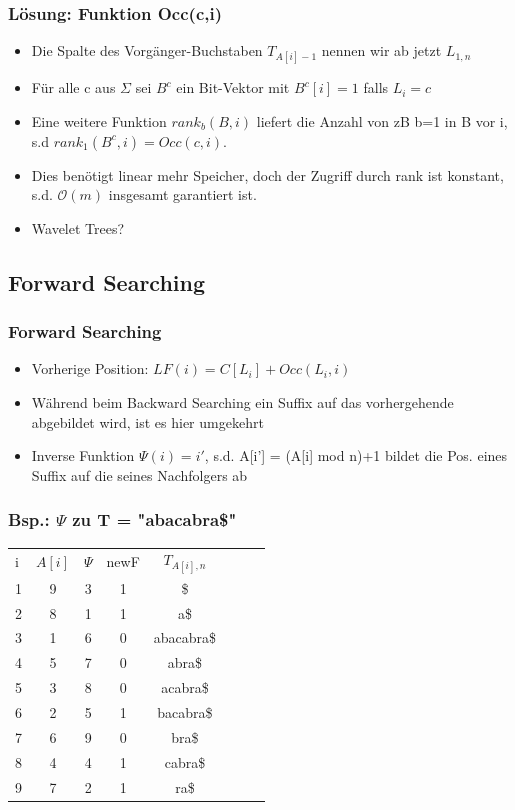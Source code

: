 \documentclass{beamer}
\begin{document}
\begin{frame}
\frametitle{L\"osung: Funktion Occ(c,i)}
\begin{itemize}
\item Die Spalte des Vorg\"anger-Buchstaben $T_{A[i]-1}$ nennen wir ab jetzt $L_{1,n}$
\item F\"ur alle c aus $\Sigma$ sei $B^{c}$ ein Bit-Vektor mit $B^{c}[i] = 1$ falls $L_{i} = c$
\item Eine weitere Funktion $rank_{b}(B,i)$ liefert die Anzahl von zB b=1 in B vor i, s.d $rank_{1}(B^{c},i) = Occ(c,i)$.
\item Dies ben\"otigt linear mehr Speicher, doch der Zugriff durch rank ist konstant, s.d. ${ \scriptstyle \mathcal{O	}}(m)$ insgesamt garantiert ist.
\item Wavelet Trees?
\end{itemize}
\end{frame}
\begin{frame}
\subsection{Forward Searching}
\frametitle{Forward Searching}
\begin{itemize}
\item Vorherige Position: $LF(i) = C[L_i] + Occ(L_i,i)$
\item W\"ahrend beim Backward Searching ein Suffix auf das vorhergehende abgebildet wird, ist es hier umgekehrt
\item Inverse Funktion $\Psi(i) = i'$, s.d. A[i'] = (A[i] mod n)+1 bildet die Pos. eines Suffix auf die seines Nachfolgers ab
\end{itemize}
\end{frame}
\begin{frame}
\frametitle{Bsp.: $\Psi$ zu T = "abacabra\$"}
\begin{tabular}{l c cc ccc r}
i & $A[i]$ & $\Psi$ & newF & $T_{A[i],n}$ \\
1 & 9 & 3 & 1 &\$\\
2 & 8 & 1 & 1&a\$\\
3 & 1 & 6 & 0&abacabra\$\\
4 & 5 & 7 & 0&abra\$\\
5 & 3 & 8 & 0&acabra\$\\
6 & 2 & 5 & 1&bacabra\$\\
7 & 6 & 9 & 0&bra\$\\
8 & 4 & 4 & 1&cabra\$\\
9 & 7 & 2 & 1&ra\$\\
\end{tabular}
\end{frame}
\end{document}
